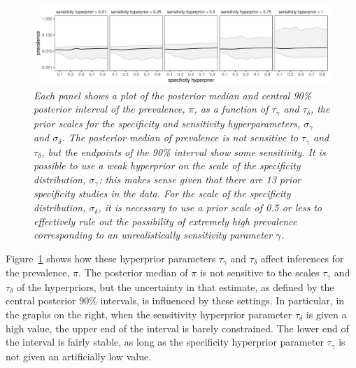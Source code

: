 \documentclass[11pt]{article}
\begin{document}
\begin{figure}
  \centerline{\includegraphics[width=\textwidth]{prior-sensitivity.pdf}}
  \vspace{-.15in}
\caption{\em Each panel shows a plot of the posterior median and central 90\%
  posterior interval of the prevalence, $\pi$, as a function of $\tau_{\gamma}$ and $\tau_{\delta}$, the prior scales for the specificity  and sensitivity
  hyperparameters, $\sigma_{\gamma}$ and $\sigma_{\delta}$.
  The posterior median of prevalence is not sensitive to $\tau_{\gamma}$ and $\tau_{\delta}$, but the endpoints of the 90\% interval show some sensitivity.  It is possible to use a weak hyperprior on the scale of the specificity distribution,  $\sigma_{\gamma}$:  this makes sense given that there are 13 prior specificity studies in the data.  For the scale of the specificity distribution,  $\sigma_{\delta}$, it is necessary to use a prior scale of 0.5 or less to effectively rule out the possibility of extremely high prevalence  corresponding to an unrealistically sensitivity parameter $\gamma$.}\label{prior-sensitivity.fig}
\end{figure}

Figure~\ref{prior-sensitivity.fig} shows how these hyperprior parameters $\tau_{\gamma}$ and $\tau_{\delta}$ affect inferences for the prevalence, $\pi$.
The posterior median of $\pi$ is not sensitive to the scales
 $\tau_{\gamma}$ and $\tau_{\delta}$ of the hyperpriors, but the
uncertainty in that estimate, as defined by the central posterior 90\%
intervals, is influenced by these settings.  In particular, in the graphs on the right, when the sensitivity hyperprior parameter $\tau_{\delta}$ is given a high value, the upper end of the interval is barely constrained.  The lower end of the interval is fairly stable, as long as the specificity hyperprior parameter $\tau_{\gamma}$ is not given an artificially low value.
\end{document}

